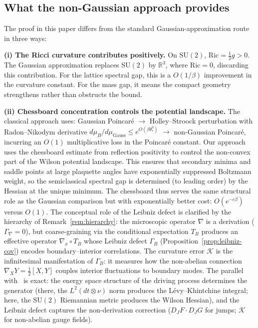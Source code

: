 \documentclass[11pt,a4paper]{article}
\theoremstyle{plain}
\theoremstyle{definition}
\theoremstyle{remark}
\newcommand{\R}{\mathbb{R}}
\newcommand{\SU}{\mathrm{SU}}
\newcommand{\Ric}{\mathrm{Ric}}
\newcommand{\cK}{\mathcal{K}}
\begin{document}
\subsection{What the non-Gaussian approach provides}

The proof in this paper differs from the standard Gaussian-approximation
route in three ways:

\medskip\noindent
\textbf{(i) The Ricci curvature contributes positively.}
On $\SU(2)$, $\Ric = \frac{1}{2}g > 0$. The Gaussian approximation
replaces $\SU(2)$ by $\R^3$, where $\Ric = 0$, discarding this
contribution. For the lattice spectral gap, this is a $O(1/\beta)$
improvement in the curvature constant. For the mass gap, it means the
compact geometry strengthens rather than obstructs the bound.

\medskip\noindent
\textbf{(ii) Chessboard concentration controls the potential landscape.}
The classical approach uses: Gaussian Poincar\'e $\to$
Holley--Stroock perturbation with Radon--Nikodym derivative
$d\mu_B/d\mu_{\mathrm{Gauss}} \leq e^{O(\beta\theta_*^3)}$ $\to$
non-Gaussian Poincar\'e, incurring an $O(1)$ multiplicative loss in
the Poincar\'e constant. Our approach uses the chessboard estimate
from reflection positivity to control the non-convex part of the
Wilson potential landscape. This ensures that secondary minima and
saddle points at large plaquette angles have exponentially
suppressed Boltzmann weight, so the semiclassical spectral gap is
determined (to leading order) by the Hessian at the unique minimum.
The chessboard thus serves the same structural role as the Gaussian
comparison but with exponentially better cost: $O(e^{-c\beta})$
versus $O(1)$.
The conceptual role of the Leibniz defect is clarified by the hierarchy
of Remark~\ref{rem:hierarchy}: the microscopic operator $\nabla$ is a
derivation ($\Gamma_\nabla = 0$), but coarse-graining via the
conditional expectation $T_B$ produces an effective operator
$\nabla_x \circ T_B$ whose Leibniz defect $\Gamma_B$
(Proposition~\ref{prop:leibniz-cov}) encodes boundary--interior
correlations. The curvature error $\cK$ is the infinitesimal
manifestation of $\Gamma_B$: it measures how the non-abelian
connection $\nabla_X Y = \frac{1}{2}[X,Y]$ couples interior
fluctuations to boundary modes. The parallel with~\cite{Fontes2026i}
is exact: the energy space structure of the driving process determines
the generator (there, the $L^2(dt \otimes \nu)$ norm produces the
L\'evy--Khintchine integral; here, the $\SU(2)$ Riemannian metric
produces the Wilson Hessian), and the Leibniz defect captures the
non-derivation correction ($D_J F \cdot D_J G$ for jumps; $\cK$ for
non-abelian gauge fields).
\end{document}
